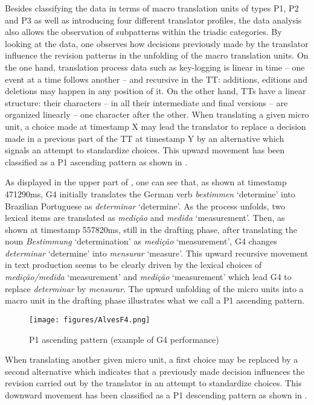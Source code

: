 \documentclass[output=paper]{LSP/langsci}
\begin{document}
\largerpage
Besides classifying the data in terms of macro translation units of types P1, P2 and P3 as well as introducing four different translator profiles, the data analysis also allows the observation of subpatterns within the triadic categories. By looking at the data, one observes how decisions previously made by the translator influence the revision patterns in the unfolding of the macro translation units. On the one hand, translation process data such as key-logging is linear in time -- one event at a time follows another -- and recursive in the TT: additions, editions and deletions may happen in any position of it. On the other hand, TTs have a linear structure: their characters -- in all their intermediate and final versions -- are organized linearly -- one character after the other. When translating a given micro unit, a choice made at timestamp X may lead the translator to replace a decision made in a previous part of the TT at timestamp Y by an alternative which signals an attempt to standardize choices. This upward movement has been classified as a P1 ascending pattern as shown in .

As displayed in the upper part of , one can see that, as shown at timestamp 471290ms, G4 initially translates the German verb \textit{bestimmen} `determine' into Brazilian Portuguese as \textit{determinar} `determine'. As the process unfolds, two lexical items are translated as \textit{medição} and \textit{medida} `measurement'. Then, as shown at timestamp 557820ms, still in the drafting phase, after translating the noun \textit{Bestimmung} `determination' as \textit{medição} `measurement', G4 changes \textit{determinar} `determine' into \textit{mensurar} `measure'. This upward recursive movement in text production seems to be clearly driven by the lexical choices of \textit{medição/medida} `measurement' and \textit{medição} `measurement' which lead G4 to replace \textit{determinar} by \textit{mensurar}. The upward unfolding of the micro units into a macro unit in the drafting phase illustrates what we call a P1 ascending pattern. 

  
\begin{figure}
\texttt{[image: figures/AlvesF4.png]}
\caption{P1 ascending pattern (example of G4 performance)}
\label{fig:alves:4}
\end{figure} 

When translating another given micro unit, a first choice may be replaced by a second alternative which indicates that a previously made decision influences the revision carried out by the translator in an attempt to standardize choices. This downward movement has been classified as a P1 descending pattern as shown in . 
\end{document}
